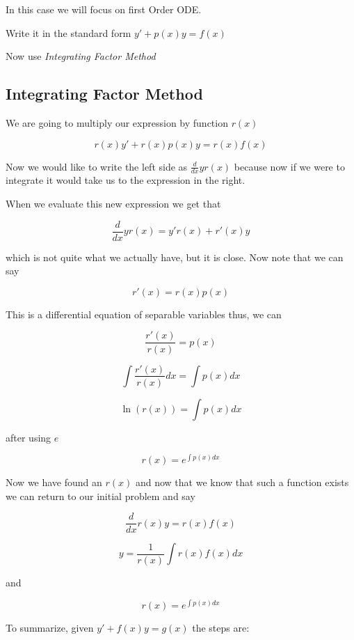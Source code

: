 In this case we will focus on first Order ODE.

Write it in the standard form \(y' + p(x)y = f(x)\)

Now use \emph{Integrating Factor Method}

\subsection{Integrating Factor Method}

We are going to multiply our expression by function \(r(x)\) 

\[
    r(x)y' + r(x)p(x)y = r(x)f(x)
\]

Now we would like to write the left side as \(\frac{d}{dx} y r(x)\) because now if we
were to integrate it would take us to the expression in the right.

When we evaluate this new expression we get that

\[
    \frac{d}{dx} y r(x) = y'r(x) + r'(x)y
\]

which is not quite what we actually have, but it is close. Now note that we can say

\[
    r'(x) = r(x)p(x)
\]

This is a differential equation of separable variables thus, we can

\[
    \frac{r'(x)}{r(x)} = p(x)
\]

\[
    \int \frac{r'(x)}{r(x)}dx = \int p(x)dx
\]

\[
    \ln(r(x)) = \int p(x) dx
\]

after using \(e\)

\[ 
    r(x) = e^{\int p(x) dx}
\]

Now we have found an \(r(x)\) and now that we know that such a function exists we can return 
to our initial problem and say

\[
    \frac{d}{dx}r(x)y = r(x)f(x)
\]

\[
    y = \frac{1}{r (x) } \int r (x) f (x) dx
\]

and 

\[
    r(x) = e^{\int p (x) dx}
\]

To summarize, given \(y' + f(x)y = g(x)\) the steps are:

